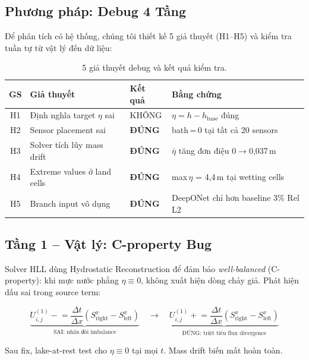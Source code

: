 \documentclass[12pt,a4paper]{article}
\begin{document}
\subsection{Phương pháp: Debug 4 Tầng}

Để phân tích có hệ thống, chúng tôi thiết kế 5 giả thuyết (H1--H5) và kiểm tra tuần tự từ vật lý đến dữ liệu:

\begin{table}[ht]
  \centering
  \caption{5 giả thuyết debug và kết quả kiểm tra.}
  \label{tab:hypotheses}
  \begin{tabular}{@{}clll@{}}
    \toprule
    \textbf{GS} & \textbf{Giả thuyết} & \textbf{Kết quả} & \textbf{Bằng chứng} \\
    \midrule
    H1 & Định nghĩa target $\eta$ sai & KHÔNG & $\eta = h - h_{\text{base}}$ đúng \\
    H2 & Sensor placement sai & \textbf{ĐÚNG} & bath\,=\,0 tại tất cả 20 sensors \\
    H3 & Solver tích lũy mass drift & \textbf{ĐÚNG} & $\bar{\eta}$ tăng đơn điệu 0$\to$0,037\,m \\
    H4 & Extreme values ở land cells & \textbf{ĐÚNG} & max\,$\eta$ = 4,4\,m tại wetting cells \\
    H5 & Branch input vô dụng & \textbf{ĐÚNG} & DeepONet chỉ hơn baseline 3\% Rel L2 \\
    \bottomrule
  \end{tabular}
\end{table}

\subsection{Tầng 1 -- Vật lý: C-property Bug}

Solver HLL dùng Hydrostatic Reconstruction để đảm bảo \emph{well-balanced} (C-property): khi mực nước phẳng $\eta \equiv 0$, không xuất hiện dòng chảy giả. Phát hiện dấu sai trong source term:

\begin{equation}
  \underbrace{U_{i,j}^{(1)} \mathrel{-}= \frac{\Delta t}{\Delta x}(S^x_{\text{right}} - S^x_{\text{left}})}_{\text{SAI: nhân đôi imbalance}}
  \quad \longrightarrow \quad
  \underbrace{U_{i,j}^{(1)} \mathrel{+}= \frac{\Delta t}{\Delta x}(S^x_{\text{right}} - S^x_{\text{left}})}_{\text{ĐÚNG: triệt tiêu flux divergence}}
\end{equation}

Sau fix, lake-at-rest test cho $\eta \equiv 0$ tại mọi $t$. Mass drift biến mất hoàn toàn.
\end{document}
